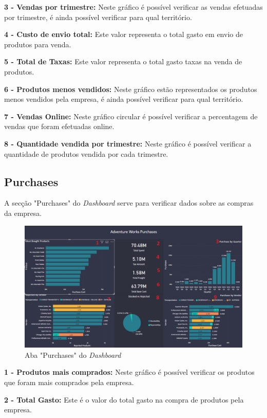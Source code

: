\textbf{3 - Vendas por trimestre:} Neste gráfico é possível verificar as vendas efetuadas por trimestre, é ainda possível verificar para qual território.

\textbf{4 - Custo de envio total:} Este valor representa o total gasto em envio de produtos para venda.

\textbf{5 - Total de Taxas:} Este valor representa o total gasto taxas na venda de produtos.

\textbf{6 - Produtos menos vendidos:} Neste gráfico estão representados os produtos menos vendidos pela empresa, é ainda possível verificar para qual território.

\textbf{7 - Vendas Online:} Neste gráfico circular é possível verificar a percentagem de vendas que foram efetuadas online.

\textbf{8 - Quantidade vendida por trimestre:} Neste gráfico é possível verificar a quantidade de produtos vendida por cada trimestre. 

\newpage
\subsection{Purchases}

A secção "Purchases" do \textit{Dashboard} serve para verificar dados sobre as compras da empresa.


\begin{figure}[H]
    \centering
    \includegraphics[scale=0.4]{images/Purchases.png}
    \caption{Aba "Purchases" do \textit{Dashboard}}
\end{figure}

\textbf{1 - Produtos mais comprados:} Neste gráfico é possível verificar os produtos que foram mais comprados pela empresa.

\textbf{2 - Total Gasto:} Este é o valor do total gasto na compra de produtos pela empresa.

